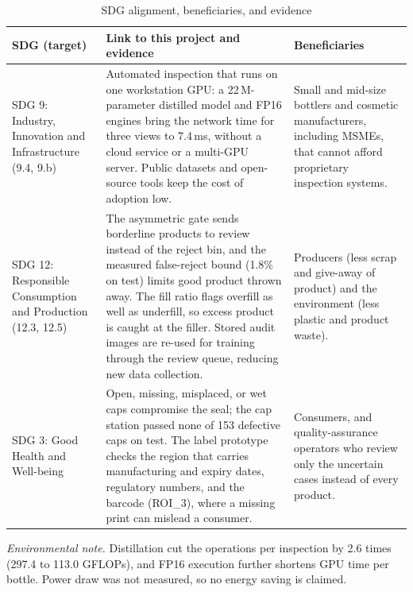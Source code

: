 \begin{table}[htbp]
\centering
\caption{SDG alignment, beneficiaries, and evidence}
\label{tab:sdg}
\footnotesize
\begin{tabularx}{\textwidth}{|p{2.8cm}|X|p{3.2cm}|}
\hline
\textbf{SDG (target)} & \textbf{Link to this project and evidence} & \textbf{Beneficiaries} \\ \hline
SDG 9: Industry, Innovation and Infrastructure (9.4, 9.b) & Automated inspection that runs on one workstation GPU: a 22\,M-parameter distilled model and FP16 engines bring the network time for three views to 7.4\,ms, without a cloud service or a multi-GPU server. Public datasets and open-source tools keep the cost of adoption low. & Small and mid-size bottlers and cosmetic manufacturers, including MSMEs, that cannot afford proprietary inspection systems. \\ \hline
SDG 12: Responsible Consumption and Production (12.3, 12.5) & The asymmetric gate sends borderline products to review instead of the reject bin, and the measured false-reject bound (1.8\% on test) limits good product thrown away. The fill ratio flags overfill as well as underfill, so excess product is caught at the filler. Stored audit images are re-used for training through the review queue, reducing new data collection. & Producers (less scrap and give-away of product) and the environment (less plastic and product waste). \\ \hline
SDG 3: Good Health and Well-being & Open, missing, misplaced, or wet caps compromise the seal; the cap station passed none of 153 defective caps on test. The label prototype checks the region that carries manufacturing and expiry dates, regulatory numbers, and the barcode (ROI\_3), where a missing print can mislead a consumer. & Consumers, and quality-assurance operators who review only the uncertain cases instead of every product. \\ \hline
\end{tabularx}
\end{table}

\noindent\textit{Environmental note.} Distillation cut the operations per inspection by 2.6 times (297.4 to 113.0 GFLOPs), and FP16 execution further shortens GPU time per bottle. Power draw was not measured, so no energy saving is claimed.
